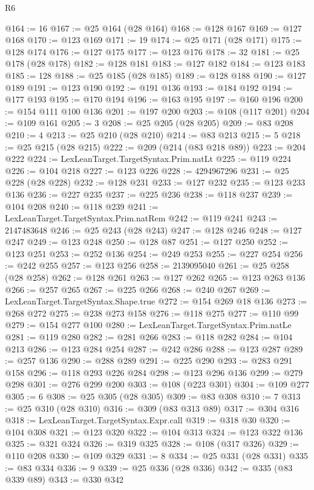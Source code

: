 \begin{lexlean}{R6}
\begin{coremodule}
@164 := 16
@167 := @25 @164 (@28 @164)
@168 := @128 @167
@169 := @127 @168
@170 := @123 @169
@171 := 19
@174 := @25 @171 (@28 @171)
@175 := @128 @174
@176 := @127 @175
@177 := @123 @176
@178 := 32
@181 := @25 @178 (@28 @178)
@182 := @128 @181
@183 := @127 @182
@184 := @123 @183
@185 := 128
@188 := @25 @185 (@28 @185)
@189 := @128 @188
@190 := @127 @189
@191 := @123 @190
@192 := @191 @136
@193 := @184 @192
@194 := @177 @193
@195 := @170 @194
@196 := @163 @195
@197 := @160 @196
@200 := @154 @111 @100 @136
@201 := @197 @200
@203 := @108 (@117 @201)
@204 := @109 @161
@205 := 3
@208 := @25 @205 (@28 @205)
@209 := @83 @208
@210 := 4
@213 := @25 @210 (@28 @210)
@214 := @83 @213
@215 := 5
@218 := @25 @215 (@28 @215)
@222 := @209 (@214 (@83 @218 @89))
@223 := @204 @222
@224 := LexLeanTarget.TargetSyntax.Prim.natLt
@225 := @119 @224
@226 := @104 @218
@227 := @123 @226
@228 := 4294967296
@231 := @25 @228 (@28 @228)
@232 := @128 @231
@233 := @127 @232
@235 := @123 @233 @136
@236 := @227 @235
@237 := @225 @236
@238 := @118 @237
@239 := @104 @208
@240 := @118 @239
@241 := LexLeanTarget.TargetSyntax.Prim.natRem
@242 := @119 @241
@243 := 2147483648
@246 := @25 @243 (@28 @243)
@247 := @128 @246
@248 := @127 @247
@249 := @123 @248
@250 := @128 @87
@251 := @127 @250
@252 := @123 @251
@253 := @252 @136
@254 := @249 @253
@255 := @227 @254
@256 := @242 @255
@257 := @123 @256
@258 := 2139095040
@261 := @25 @258 (@28 @258)
@262 := @128 @261
@263 := @127 @262
@265 := @123 @263 @136
@266 := @257 @265
@267 := @225 @266
@268 := @240 @267
@269 := LexLeanTarget.TargetSyntax.Shape.true
@272 := @154 @269 @18 @136
@273 := @268 @272
@275 := @238 @273 @158
@276 := @118 @275
@277 := @110 @99
@279 := @154 @277 @100
@280 := LexLeanTarget.TargetSyntax.Prim.natLe
@281 := @119 @280
@282 := @281 @266
@283 := @118 @282
@284 := @104 @213
@286 := @123 @284 @254
@287 := @242 @286
@288 := @123 @287
@289 := @257 @136
@290 := @288 @289
@291 := @225 @290
@293 := @283 @291 @158
@296 := @118 @293 @226 @284
@298 := @123 @296 @136
@299 := @279 @298
@301 := @276 @299 @200
@303 := @108 (@223 @301)
@304 := @109 @277
@305 := 6
@308 := @25 @305 (@28 @305)
@309 := @83 @308
@310 := 7
@313 := @25 @310 (@28 @310)
@316 := @309 (@83 @313 @89)
@317 := @304 @316
@318 := LexLeanTarget.TargetSyntax.Expr.call
@319 := @318 @30
@320 := @104 @308
@321 := @123 @320
@322 := @104 @313
@324 := @123 @322 @136
@325 := @321 @324
@326 := @319 @325
@328 := @108 (@317 @326)
@329 := @110 @208
@330 := @109 @329
@331 := 8
@334 := @25 @331 (@28 @331)
@335 := @83 @334
@336 := 9
@339 := @25 @336 (@28 @336)
@342 := @335 (@83 @339 @89)
@343 := @330 @342

\end{coremodule}
\end{lexlean}
